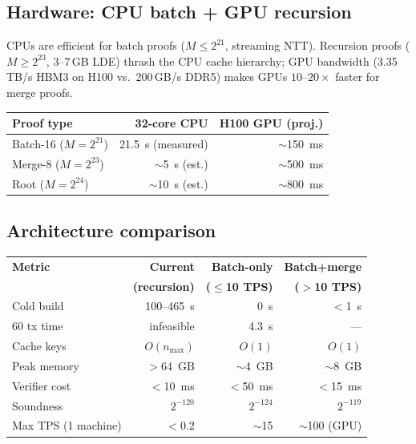 \documentclass[11pt]{article}
\begin{document}
\subsection{Hardware: CPU batch + GPU recursion}

CPUs are efficient for batch proofs ($M \le 2^{21}$, streaming NTT).
Recursion proofs ($M \ge 2^{23}$, 3--7\,GB LDE) thrash the CPU cache
hierarchy; GPU bandwidth (3.35\,TB/s HBM3 on H100 vs.\ 200\,GB/s DDR5)
makes GPUs $10$--$20\times$ faster for merge proofs.

\begin{center}
\begin{tabular}{@{}lrr@{}}
\toprule
\textbf{Proof type} & \textbf{32-core CPU} & \textbf{H100 GPU (proj.)} \\
\midrule
Batch-16 ($M = 2^{21}$) & 21.5~s (measured) & $\sim$150~ms \\
Merge-8 ($M = 2^{23}$) & $\sim$5~s (est.) & $\sim$500~ms \\
Root ($M = 2^{24}$) & $\sim$10~s (est.) & $\sim$800~ms \\
\bottomrule
\end{tabular}
\end{center}

\subsection{Architecture comparison}

\begin{center}
\begin{tabular}{@{}lrrr@{}}
\toprule
\textbf{Metric} & \textbf{Current} & \textbf{Batch-only} &
  \textbf{Batch+merge} \\
& \textbf{(recursion)} & \textbf{($\le$10 TPS)} &
  \textbf{($>$10 TPS)} \\
\midrule
Cold build & 100--465~s & 0~s & $<$1~s \\
60 tx time & infeasible & 4.3~s & --- \\
Cache keys & $O(n_{\max})$ & $O(1)$ & $O(1)$ \\
Peak memory & $>$64~GB & $\sim$4~GB & $\sim$8~GB \\
Verifier cost & $<$10~ms & $<$50~ms & $<$15~ms \\
Soundness & $2^{-120}$ & $2^{-124}$ & $2^{-119}$ \\
Max TPS (1 machine) & $<$0.2 & $\sim$15 & $\sim$100 (GPU) \\
\bottomrule
\end{tabular}
\end{center}
\end{document}
